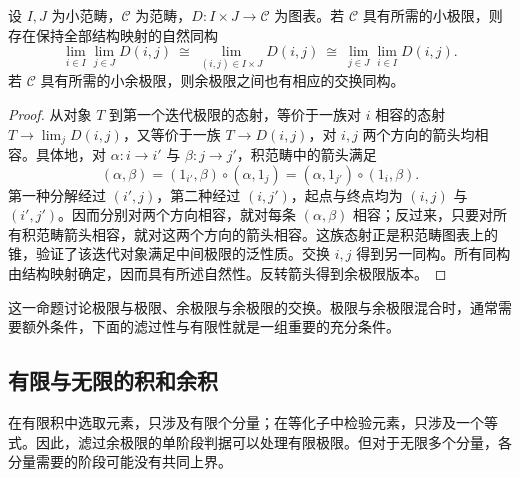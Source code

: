 \begin{proposition}[同类极限的交换]\label{b4:prop:limits-fubini}
	设 \(I,J\) 为小范畴，\(\mathcal C\) 为范畴，\(D:I\times J\rightarrow\mathcal C\) 为图表。若 \(\mathcal C\) 具有所需的小极限，则存在保持全部结构映射的自然同构
	\[
		\lim_{i\in I}\lim_{j\in J}D(i,j) \ \cong\
		\lim_{(i,j)\in I\times J}D(i,j) \ \cong\
		\lim_{j\in J}\lim_{i\in I}D(i,j).
	\]
	若 \(\mathcal C\) 具有所需的小余极限，则余极限之间也有相应的交换同构。
\end{proposition}
\begin{proof}
	从对象 \(T\) 到第一个迭代极限的态射，等价于一族对 \(i\) 相容的态射 \(T\rightarrow\lim_jD(i,j)\)，又等价于一族 \(T\rightarrow D(i,j)\)，对 \(i,j\) 两个方向的箭头均相容。具体地，对 \(\alpha:i\rightarrow i'\) 与 \(\beta:j\rightarrow j'\)，积范畴中的箭头满足
	\[
		(\alpha,\beta) =(1_{i'},\beta)\circ(\alpha,1_j) =(\alpha,1_{j'})\circ(1_i,\beta).
	\]
	第一种分解经过 \((i',j)\)，第二种经过 \((i,j')\)，起点与终点均为 \((i,j)\) 与 \((i',j')\)。因而分别对两个方向相容，就对每条 \((\alpha,\beta)\) 相容；反过来，只要对所有积范畴箭头相容，就对这两个方向的箭头相容。这族态射正是积范畴图表上的锥，验证了该迭代对象满足中间极限的泛性质。交换 \(i,j\) 得到另一同构。所有同构由结构映射确定，因而具有所述自然性。反转箭头得到余极限版本。
\end{proof}

这一命题讨论极限与极限、余极限与余极限的交换。极限与余极限混合时，通常需要额外条件，下面的滤过性与有限性就是一组重要的充分条件。

\subsection{有限与无限的积和余积}
\label{b4:subsec:0204:02}

在有限积中选取元素，只涉及有限个分量；在等化子中检验元素，只涉及一个等式。因此，滤过余极限的单阶段判据可以处理有限极限。但对于无限多个分量，各分量需要的阶段可能没有共同上界。

